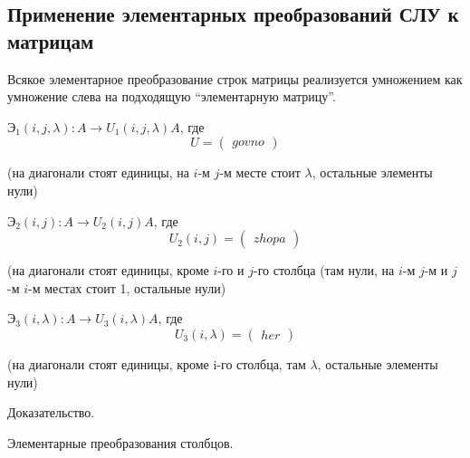 \subsection{Применение элементарных преобразований СЛУ к матрицам}


Всякое элементарное преобразование строк матрицы реализуется умножением как умножение слева на подходящую ``элементарную матрицу''.


$\text{Э}_1(i, j, \lambda): A \to U_1(i, j, \lambda)A$, где
\[ 
    U = \begin{pmatrix} govno \end{pmatrix}
\]

(на диагонали стоят единицы, на $i$-м $j$-м месте стоит $\lambda$, остальные элементы нули)

$\text{Э}_2(i, j): A \to U_2(i, j)A$, где
\[
    U_2(i, j) = \begin{pmatrix} zhopa \end{pmatrix}
\]

(на диагонали стоят единицы, кроме $i$-го и $j$-го столбца (там нули, на $i$-м $j$-м и $j$-м $i$-м местах стоит 1, остальные нули)

$\text{Э}_3(i, \lambda): A \to U_3(i, \lambda)A$, где
\[
    U_3(i, \lambda) = \begin{pmatrix} her \end{pmatrix}
\]

(на диагонали стоят единицы, кроме i-го столбца, там $\lambda$, остальные элементы нули)

\begin{exercise}
    Доказательство.
\end{exercise}

\begin{exercise}
    Элементарные преобразования столбцов.
\end{exercise}

